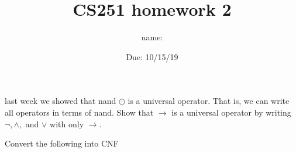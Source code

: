 \documentclass{exam}
\title{CS251 homework 2}
\author{name:\underline{\hspace{2in}}}
\date{Due: 10/15/19}
\def\land{\wedge}           %
\def\lor{\vee}              %
\def\lnot{\neg}             %
\newcommand{\premise}    [1]{\AxiomC{#1}}
\newcommand{\andI}       [1]{\RightLabel{$\land I$} \BinaryInfC{#1} }
\newcommand{\andEL}      [1]{\RightLabel{$\land E1$}\UnaryInfC{#1}  }
\newcommand{\andER}      [1]{\RightLabel{$\land E2$}\UnaryInfC{#1}  }
\begin{document}
\maketitle

\begin{questions}


%
%
%




\question
    last week we showed that nand $\odot$ is a universal operator.
    That is, we can write all operators in terms of nand.
    Show that $\to$ is a universal operator by writing $\lnot, \land,$ and $\lor$
    with only $\to$.

\pagebreak

\question
Convert the following into CNF

\end{questions}
\end{document}
